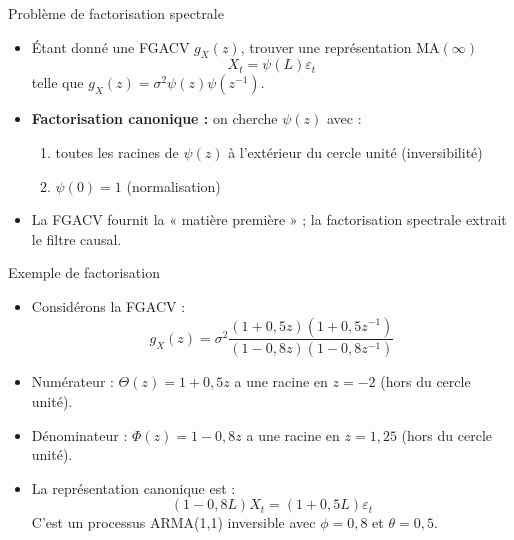 \documentclass[11pt,aspectratio=169]{beamer}
\begin{document}
\begin{frame}{Problème de factorisation spectrale}

\begin{itemize}

\item Étant donné une FGACV $g_X(z)$, trouver une représentation MA$(\infty)$
  \[
  X_t = \psi(L)\varepsilon_t
  \]
  telle que $g_X(z) = \sigma^2 \psi(z)\psi(z^{-1})$.\newline

\item \textbf{Factorisation canonique :} on cherche $\psi(z)$ avec :
  \begin{enumerate}
  \item toutes les racines de $\psi(z)$ à l'extérieur du cercle unité (inversibilité)\newline
  \item $\psi(0) = 1$ (normalisation)
  \end{enumerate}

\item La FGACV fournit la « matière première » ; la factorisation spectrale extrait le filtre causal.

\end{itemize}

\end{frame}

\begin{frame}{Exemple de factorisation}

\begin{itemize}

\item Considérons la FGACV :
  \[
  g_X(z) = \sigma^2 \frac{(1 + 0{,}5z)(1 + 0{,}5z^{-1})}{(1 - 0{,}8z)(1 - 0{,}8z^{-1})}
  \]\newline

\item Numérateur : $\Theta(z) = 1 + 0{,}5z$ a une racine en $z = -2$ (hors du cercle unité).\newline

\item Dénominateur : $\Phi(z) = 1 - 0{,}8z$ a une racine en $z = 1{,}25$ (hors du cercle unité).\newline

\item La représentation canonique est :
  \[
  (1 - 0{,}8L)X_t = (1 + 0{,}5L)\varepsilon_t
  \]
  C'est un processus ARMA(1,1) inversible avec $\phi = 0{,}8$ et $\theta = 0{,}5$.

\end{itemize}

\end{frame}
\end{document}
